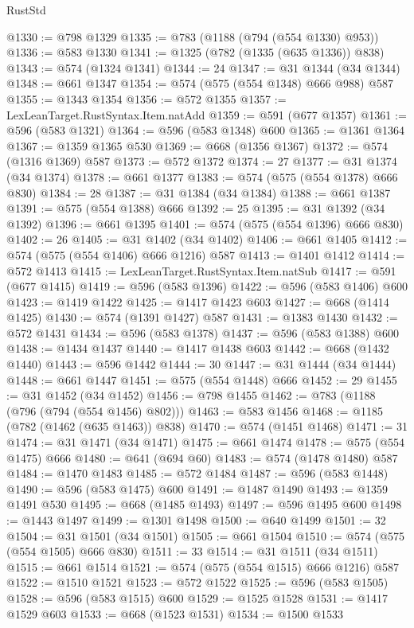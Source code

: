 \begin{lexlean}{RustStd}
\begin{coremodule}
@1330 := @798 @1329
@1335 := @783 (@1188 (@794 (@554 @1330) @953))
@1336 := @583 @1330
@1341 := @1325 (@782 (@1335 (@635 @1336)) @838)
@1343 := @574 (@1324 @1341)
@1344 := 24
@1347 := @31 @1344 (@34 @1344)
@1348 := @661 @1347
@1354 := @574 (@575 (@554 @1348) @666 @988) @587
@1355 := @1343 @1354
@1356 := @572 @1355
@1357 := LexLeanTarget.RustSyntax.Item.natAdd
@1359 := @591 (@677 @1357)
@1361 := @596 (@583 @1321)
@1364 := @596 (@583 @1348) @600
@1365 := @1361 @1364
@1367 := @1359 @1365 @530
@1369 := @668 (@1356 @1367)
@1372 := @574 (@1316 @1369) @587
@1373 := @572 @1372
@1374 := 27
@1377 := @31 @1374 (@34 @1374)
@1378 := @661 @1377
@1383 := @574 (@575 (@554 @1378) @666 @830)
@1384 := 28
@1387 := @31 @1384 (@34 @1384)
@1388 := @661 @1387
@1391 := @575 (@554 @1388) @666
@1392 := 25
@1395 := @31 @1392 (@34 @1392)
@1396 := @661 @1395
@1401 := @574 (@575 (@554 @1396) @666 @830)
@1402 := 26
@1405 := @31 @1402 (@34 @1402)
@1406 := @661 @1405
@1412 := @574 (@575 (@554 @1406) @666 @1216) @587
@1413 := @1401 @1412
@1414 := @572 @1413
@1415 := LexLeanTarget.RustSyntax.Item.natSub
@1417 := @591 (@677 @1415)
@1419 := @596 (@583 @1396)
@1422 := @596 (@583 @1406) @600
@1423 := @1419 @1422
@1425 := @1417 @1423 @603
@1427 := @668 (@1414 @1425)
@1430 := @574 (@1391 @1427) @587
@1431 := @1383 @1430
@1432 := @572 @1431
@1434 := @596 (@583 @1378)
@1437 := @596 (@583 @1388) @600
@1438 := @1434 @1437
@1440 := @1417 @1438 @603
@1442 := @668 (@1432 @1440)
@1443 := @596 @1442
@1444 := 30
@1447 := @31 @1444 (@34 @1444)
@1448 := @661 @1447
@1451 := @575 (@554 @1448) @666
@1452 := 29
@1455 := @31 @1452 (@34 @1452)
@1456 := @798 @1455
@1462 := @783 (@1188 (@796 (@794 (@554 @1456) @802)))
@1463 := @583 @1456
@1468 := @1185 (@782 (@1462 (@635 @1463)) @838)
@1470 := @574 (@1451 @1468)
@1471 := 31
@1474 := @31 @1471 (@34 @1471)
@1475 := @661 @1474
@1478 := @575 (@554 @1475) @666
@1480 := @641 (@694 @60)
@1483 := @574 (@1478 @1480) @587
@1484 := @1470 @1483
@1485 := @572 @1484
@1487 := @596 (@583 @1448)
@1490 := @596 (@583 @1475) @600
@1491 := @1487 @1490
@1493 := @1359 @1491 @530
@1495 := @668 (@1485 @1493)
@1497 := @596 @1495 @600
@1498 := @1443 @1497
@1499 := @1301 @1498
@1500 := @640 @1499
@1501 := 32
@1504 := @31 @1501 (@34 @1501)
@1505 := @661 @1504
@1510 := @574 (@575 (@554 @1505) @666 @830)
@1511 := 33
@1514 := @31 @1511 (@34 @1511)
@1515 := @661 @1514
@1521 := @574 (@575 (@554 @1515) @666 @1216) @587
@1522 := @1510 @1521
@1523 := @572 @1522
@1525 := @596 (@583 @1505)
@1528 := @596 (@583 @1515) @600
@1529 := @1525 @1528
@1531 := @1417 @1529 @603
@1533 := @668 (@1523 @1531)
@1534 := @1500 @1533

\end{coremodule}
\end{lexlean}
